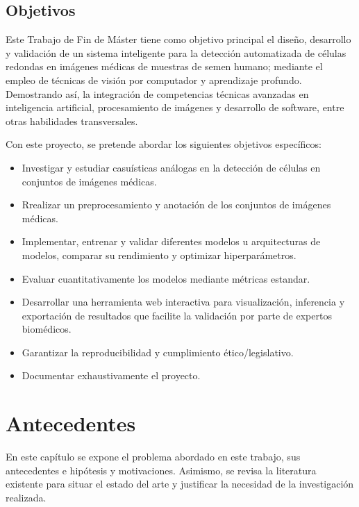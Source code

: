 \documentclass[12pt,a4paper,onecolumn,oneside]{report}
\begin{document}
\section{Objetivos}
\label{sec:Objetivos}

Este Trabajo de Fin de Máster tiene como objetivo principal el diseño, desarrollo y validación de un sistema inteligente para la detección automatizada de células redondas en imágenes médicas de muestras de semen humano;
mediante el empleo de técnicas de visión por computador y aprendizaje profundo. 
Demostrando así, la integración de competencias técnicas avanzadas en inteligencia artificial, procesamiento de imágenes y desarrollo de software, entre otras habilidades transversales. 

Con este proyecto, se pretende abordar los siguientes objetivos específicos: 

\begin{itemize}
  \item Investigar y estudiar casuísticas análogas en la detección de células en conjuntos de imágenes médicas.
  \item Rrealizar un preprocesamiento y anotación de los conjuntos de imágenes médicas.
  \item Implementar, entrenar y validar diferentes modelos u arquitecturas de modelos, comparar su rendimiento y optimizar hiperparámetros.
  \item Evaluar cuantitativamente los modelos mediante métricas estandar.
  \item Desarrollar una herramienta web interactiva para visualización, inferencia y exportación de resultados que facilite la validación por parte de expertos biomédicos.
  \item Garantizar la reproducibilidad y cumplimiento ético/legislativo.
  \item Documentar exhaustivamente el proyecto.
\end{itemize}


\chapter{Antecedentes} %
\label{Antecedentes}

En este capítulo se expone el problema abordado en este trabajo, sus antecedentes e hipótesis y motivaciones. 
Asimismo, se revisa la literatura existente para situar el estado del arte y justificar la necesidad de la investigación realizada.
\end{document}

